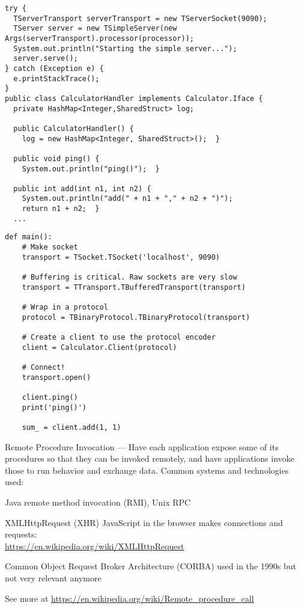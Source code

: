 \documentclass[Screen16to9,17pt]{foils}
\begin{document}

\begin{verbatim}
try {
  TServerTransport serverTransport = new TServerSocket(9090);
  TServer server = new TSimpleServer(new Args(serverTransport).processor(processor));
  System.out.println("Starting the simple server...");
  server.serve();
} catch (Exception e) {
  e.printStackTrace();
}
public class CalculatorHandler implements Calculator.Iface {
  private HashMap<Integer,SharedStruct> log;

  public CalculatorHandler() {
    log = new HashMap<Integer, SharedStruct>();  }

  public void ping() {
    System.out.println("ping()");  }

  public int add(int n1, int n2) {
    System.out.println("add(" + n1 + "," + n2 + ")");
    return n1 + n2;  }
  ...
\end{verbatim}



\begin{verbatim}
def main():
    # Make socket
    transport = TSocket.TSocket('localhost', 9090)

    # Buffering is critical. Raw sockets are very slow
    transport = TTransport.TBufferedTransport(transport)

    # Wrap in a protocol
    protocol = TBinaryProtocol.TBinaryProtocol(transport)

    # Create a client to use the protocol encoder
    client = Calculator.Client(protocol)

    # Connect!
    transport.open()

    client.ping()
    print('ping()')

    sum_ = client.add(1, 1)
\end{verbatim}





Remote Procedure Invocation — Have each application expose some of its procedures so that they can be invoked remotely, and have applications invoke those to run behavior and exchange data.
Common systems and technologies used:
\begin{list2}
\item Java remote method invocation (RMI), Unix RPC
\item XMLHttpRequest (XHR) JavaScript in the browser makes connections and requests:\\ \url{https://en.wikipedia.org/wiki/XMLHttpRequest}
\item Common Object Request Broker Architecture (CORBA) used in the 1990s but not very relevant anymore
\item See more at \url{https://en.wikipedia.org/wiki/Remote_procedure_call}
\end{list2}
\end{document}
